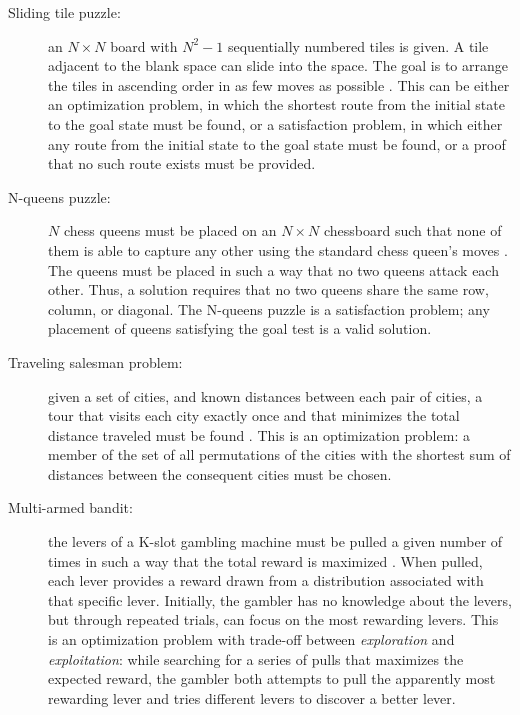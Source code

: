 \begin{description}
\item[Sliding tile puzzle:] an $N\times N$ board with $N^2-1$
  sequentially numbered tiles is given. A tile adjacent to the blank
  space can slide into the space. The goal is to arrange the tiles in
  ascending order in as few moves as
  possible \cite{Russell.aima}. This can be either an optimization
  problem, in which the shortest route from the initial state to the
  goal state must be found, or a satisfaction problem, in which either
  any route from the initial state to the goal state must be found, or a
  proof that no such route exists must be provided.

\item[N-queens puzzle:] $N$ chess queens must be placed
  on an $N\times N$ chessboard such that none of them is able to
  capture any other using the standard chess queen's
  moves \cite{Russell.aima}. The queens must be placed in such a way
  that no two queens attack each other. Thus, a solution requires that
  no two queens share the same row, column, or diagonal. The N-queens
  puzzle is a satisfaction problem; any placement of queens satisfying
  the goal test is a valid solution.

\item[Traveling salesman problem:] given a set of cities, and known
 distances between each pair of cities, a tour that visits each city
 exactly once and that minimizes the total distance traveled must be
 found \cite{Russell.aima}. This is an optimization problem: a member
 of the set of all permutations of the cities with the shortest sum of
 distances between the consequent cities must be chosen.

\item[Multi-armed bandit:] the levers of a K-slot gambling machine must be
 pulled a given number of times in such a way that the total reward 
 is maximized \cite{Vermorel.bandits}. When pulled, each lever provides a
 reward drawn from a distribution associated with that specific
 lever. Initially, the gambler has no knowledge about the levers, but
 through repeated trials, can focus on the most rewarding levers. This
 is an optimization problem with trade-off between {\em exploration}
 and {\em exploitation}: while searching for a series of pulls that maximizes
 the expected reward, the gambler both attempts to pull the apparently most
 rewarding lever and tries different levers to discover
 a better lever.
\end{description}

